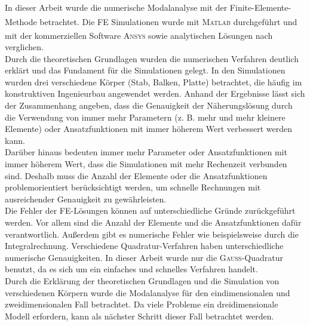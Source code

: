 \documentclass[a4paper,10pt,twoside]{article}
\numberwithin{equation}{section} %
\numberwithin{figure}{section}   %
\numberwithin{table}{section}    %
\newcommand{\Matlab}{\textsc{Matlab}\textsuperscript{\textregistered} }
\newcommand{\Ansys}{\textsc{Ansys}\textsuperscript{\textregistered} }
\begin{document}
	In dieser Arbeit wurde die numerische Modalanalyse mit der Finite-Elemente-Methode betrachtet. Die FE Simulationen wurde mit \Matlab durchgeführt und mit der kommerziellen Software \Ansys sowie analytischen Lösungen nach \cite{stephan1995schwingungen} verglichen. \\
	
	Durch die theoretischen Grundlagen wurden die numerischen Verfahren deutlich erklärt und das Fundament für die Simulationen gelegt. In den Simulationen wurden drei verschiedene Körper (Stab, Balken, Platte) betrachtet, die häufig im konstruktiven Ingenieurbau angewendet werden. Anhand der Ergebnisse lässt sich der Zusammenhang angeben, dass die Genauigkeit der Näherungslösung durch die Verwendung von immer mehr Parametern (z. B. mehr und mehr kleinere Elemente) oder Ansatzfunktionen mit immer höherem Wert verbessert werden kann.\\
	
	Darüber hinaus bedeuten immer mehr Parameter oder Ansatzfunktionen mit immer höherem Wert, dass die Simulationen mit mehr Rechenzeit verbunden sind. Deshalb muss die Anzahl der Elemente oder die Ansatzfunktionen problemorientiert berücksichtigt werden, um schnelle Rechnungen mit ausreichender Genauigkeit zu gewährleisten.\\
	
	Die Fehler der FE-Lösungen können auf unterschiedliche Gründe zurückgeführt werden. Vor allem sind die Anzahl der Elemente und die Ansatzfunktionen dafür verantwortlich. Außerdem gibt es numerische Fehler wie beispielsweise durch die Integralrechnung. Verschiedene Quadratur-Verfahren haben unterschiedliche numerische Genauigkeiten. In dieser Arbeit wurde nur die \textsc{Gauß}-Quadratur benutzt, da es sich um ein einfaches und schnelles Verfahren handelt. \\
	
	
	Durch die Erklärung der theoretischen Grundlagen und die Simulation von verschiedenen Körpern wurde die Modalanalyse für den eindimensionalen und zweidimensionalen Fall betrachtet. Da viele Probleme ein dreidimensionale Modell erfordern, kann als nächster Schritt dieser Fall betrachtet werden.
	\clearpage
	
	\newpage
	\pagestyle{empty}
	\ \\
	\newpage
	
	
	\pagestyle{fancy}
	\renewcommand{\refname}{Quellenverzeichnis}
	
	
	\clearpage
	
	\newpage
	\pagestyle{empty}
	\ \\
	\newpage
	
	
	
	
\end{document}
